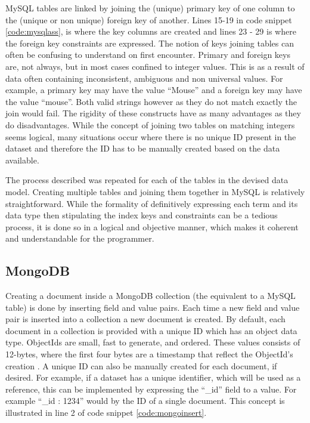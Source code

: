 MySQL tables are linked by joining the (unique) primary key of one column to the (unique or non unique) foreign key of another. Lines 15-19 in code snippet \ref{code:mysqlass}, is where the key columns are created and lines 23 - 29 is where the foreign key constraints are expressed. The notion of keys joining tables can often be confusing to understand on first encounter. Primary and foreign keys are, not always, but in most cases confined to integer values. This is as a result of data often containing inconsistent, ambiguous and non universal values. For example, a primary key may have the value ``Mouse'' and a foreign key may have the value ``mouse''. Both valid strings however as they do not match exactly the join would fail. The rigidity of these constructs have as many advantages as they do disadvantages. While the concept of joining two tables on matching integers seems logical, many situations occur where there is no unique ID present in the dataset and therefore the ID has to be manually created based on the data available.

The process described was repeated for each of the tables in the devised data model. Creating multiple tables and joining them together in MySQL is relatively straightforward. While the formality of definitively expressing each term and its data type then stipulating the index keys and constraints can be a tedious process, it is done so in a logical and objective manner, which makes it coherent and understandable for the programmer.

\subsection{MongoDB}\label{mongocreate}
Creating a document inside a MongoDB collection (the equivalent to a MySQL table) is done by inserting field and value pairs. Each time a new field and value pair is inserted into a collection a new document is created. By default, each document in a collection is provided with a unique ID which has an object data type. ObjectIds are small, fast to generate, and ordered. These values consists of 12-bytes, where the first four bytes are a timestamp that reflect the ObjectId's creation \cite{md}. A unique ID can also be manually created for each document, if desired. For example, if a dataset has a unique identifier, which will be used as a reference, this can be implemented by expressing the ``\_id'' field to a value. For example ``\_id : 1234'' would by the ID of a single document. This concept is illustrated in line 2 of code snippet \ref{code:mongoinsert}.

